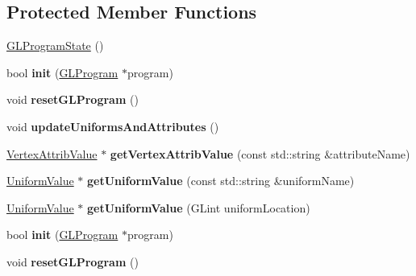 \subsection*{Protected Member Functions}
\begin{DoxyCompactItemize}
\item 
\hyperlink{classGLProgramState_ab2923b0ece19296c4ffb9222d8de9f24}{G\+L\+Program\+State} ()
\item 
\mbox{\label{classGLProgramState_a5682ceea56d18afd0c0fcd4368eb3512}} 
bool {\bfseries init} (\hyperlink{classGLProgram}{G\+L\+Program} $\ast$program)
\item 
\mbox{\label{classGLProgramState_a2af1b309703ecb297bebd8e0c70cc72b}} 
void {\bfseries reset\+G\+L\+Program} ()
\item 
\mbox{\label{classGLProgramState_a6d4e3be7de31d92ba62e282d14b3fd61}} 
void {\bfseries update\+Uniforms\+And\+Attributes} ()
\item 
\mbox{\label{classGLProgramState_a24be10826690ad258327b04af05ea278}} 
\hyperlink{classVertexAttribValue}{Vertex\+Attrib\+Value} $\ast$ {\bfseries get\+Vertex\+Attrib\+Value} (const std\+::string \&attribute\+Name)
\item 
\mbox{\label{classGLProgramState_add4e035dc172c64fba4ce04013c49dfc}} 
\hyperlink{classUniformValue}{Uniform\+Value} $\ast$ {\bfseries get\+Uniform\+Value} (const std\+::string \&uniform\+Name)
\item 
\mbox{\label{classGLProgramState_a381aeaaa0225e34bea2f7d11be2919e3}} 
\hyperlink{classUniformValue}{Uniform\+Value} $\ast$ {\bfseries get\+Uniform\+Value} (G\+Lint uniform\+Location)
\item 
\mbox{\label{classGLProgramState_a5682ceea56d18afd0c0fcd4368eb3512}} 
bool {\bfseries init} (\hyperlink{classGLProgram}{G\+L\+Program} $\ast$program)
\item 
\mbox{\label{classGLProgramState_a2af1b309703ecb297bebd8e0c70cc72b}} 
void {\bfseries reset\+G\+L\+Program} ()
\item 

\end{DoxyCompactItemize}
